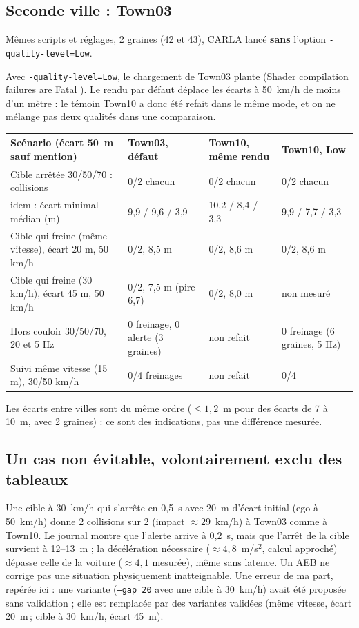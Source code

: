 \documentclass[11pt,a4paper]{article}
\providecommand{\og}{\guillemotleft\nobreakspace}
\providecommand{\fg}{\nobreakspace\guillemotright}
\newcommand{\code}[1]{\texttt{#1}}
\begin{document}
\subsection{Seconde ville : Town03}
Mêmes scripts et r\'eglages, 2 graines (42 et 43), CARLA lanc\'e \textbf{sans} l'option \code{-quality-level=Low}.
\begin{limite}
Avec \code{-quality-level=Low}, le chargement de Town03 plante (\og Shader compilation failures are Fatal \fg). Le rendu par d\'efaut d\'eplace les \'ecarts \`a 50~km/h de moins d'un m\`etre :
le t\'emoin Town10 a donc \'et\'e refait dans le m\^eme mode, et on ne m\'elange pas deux qualit\'es dans une comparaison.
\end{limite}
\begin{center}\small\begin{tabular}{@{}p{5.4cm}p{3.2cm}p{3cm}p{3cm}@{}}\toprule
Sc\'enario (\'ecart 50~m sauf mention) & Town03, d\'efaut & Town10, m\^eme rendu & Town10, Low \\\midrule
Cible arr\^et\'ee 30/50/70 : collisions & 0/2 chacun & 0/2 chacun & 0/2 chacun \\
idem : \'ecart minimal m\'edian (m) & 9,9 / 9,6 / 3,9 & 10,2 / 8,4 / 3,3 & 9,9 / 7,7 / 3,3 \\
Cible qui freine (m\^eme vitesse), \'ecart 20 m, 50 km/h & 0/2, 8,5 m & 0/2, 8,6 m & 0/2, 8,6 m \\
Cible qui freine (30 km/h), \'ecart 45 m, 50 km/h & 0/2, 7,5 m (pire 6,7) & 0/2, 8,0 m & non mesur\'e \\
Hors couloir 30/50/70, 20 et 5 Hz & 0 freinage, 0 alerte (3 graines) & non refait & 0 freinage (6 graines, 5 Hz) \\
Suivi m\^eme vitesse (15 m), 30/50 km/h & 0/4 freinages & non refait & 0/4 \\
\bottomrule\end{tabular}\end{center}
Les \'ecarts entre villes sont du m\^eme ordre ($\le1{,}2$~m pour des \'ecarts de 7 \`a 10~m, avec 2 graines) : ce sont des indications, pas une diff\'erence mesur\'ee.

\subsection{Un cas non \'evitable, volontairement exclu des tableaux}
Une cible \`a 30~km/h qui s'arr\^ete en 0,5~s avec 20~m d'\'ecart initial (ego \`a 50~km/h) donne 2 collisions sur 2 (impact $\approx29$~km/h) \`a Town03 comme \`a Town10. Le journal montre que l'alerte
arrive \`a 0,2~s, mais que l'arr\^et de la cible survient \`a 12--13~m ; la d\'ec\'el\'eration n\'ecessaire ($\approx4{,}8$~m/s$^2$, calcul approch\'e) d\'epasse celle de la voiture ($\approx4{,}1$ mesur\'ee),
m\^eme sans latence. Un AEB ne corrige pas une situation physiquement inatteignable. Une erreur de ma part, rep\'er\'ee ici : une variante (\code{--gap 20} avec une cible \`a 30~km/h)
avait \'et\'e propos\'ee sans validation ; elle est remplac\'ee par des variantes valid\'ees (m\^eme vitesse, \'ecart 20~m\,; cible \`a 30~km/h, \'ecart 45~m).
\end{document}
